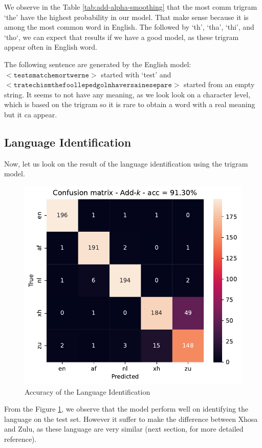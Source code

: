 We observe in the Table \ref{tab:add-alpha-smoothing} that the most comm trigram `the' have the highest probability in our model. That make sense because it is among the most common word in English. The followed by `th', `tha', `thi', and `tho`, we can expect that results if we have a good model, as these trigram appear often in English word.


The following sentence are generated by the English model: $\mathtt{<tests mat che mort werne>}$ started with `test' and $\mathtt{<trate chism the foolle ped goln haversaines epare>}$ started from an empty string. It seems to  not have any meaning, as we look look on a character level, which is based on the trigram so it is rare to obtain a word with a real meaning but it ca appear.
\subsection{Language Identification}
Now, let us look on the result of the language identification using the trigram model.
\begin{figure}[H]
	\centering
	\includegraphics[width=0.75\linewidth]{./figures/acc_lang.pdf}
	\caption{Accuracy of the Language Identification}
	\label{fig:lang-acc}
\end{figure}
From the Figure \ref{fig:lang-acc}, we observe that the model perform well on identifying the language on the test set.  However it suffer to make the difference between Xhosa and Zulu, as these language are very similar (next section, for more detailed reference).

